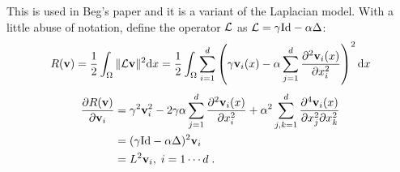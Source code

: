 \documentclass[letterpaper,12pt]{article}
\begin{document}
This is used in Beg's paper \cite{Beg2005Computing} and it is a
variant of the Laplacian model. With a little abuse of notation, define the operator $\mathcal{L}$ as $\mathcal{L} = \gamma \text{Id} - \alpha \Delta$:
\begin{align}
& R(\mathbf{v}) = \frac{1}{2} \int_\Omega \| \mathcal{L} \mathbf{v} \| ^2 \text{d} x
= \frac{1}{2} \int_\Omega \sum_{i=1}^d  
\left(
\gamma \mathbf{v}_i(x) - \alpha \sum_{j=1}^d  \frac{\partial^2 \mathbf{v}_i(x)}{\partial x_i^2}
\right)^2 \text{d} x
\\
\end{align}
\begin{equation}
\label{eq:dBeg}
\begin{split}
\frac{\partial R(\mathbf{v})}{\partial \mathbf{v}_i} 
& = 
\gamma^2 \mathbf{v}_i^2 - 2 \gamma \alpha \sum_{j=1}^d{\frac{\partial^2 \mathbf{v}_i(x)}{\partial x_i^2}} 
+ \alpha^2 \sum_{j,k=1}^d{\frac{\partial^4 \mathbf{v}_i(x)}{\partial x_j^2 \partial x_k^2}} 
\\
& = (\gamma \text{Id} - \alpha \Delta)^2 \mathbf{v}_i \\
& = L^2 \mathbf{v}_i
, \; i=1 \cdots d \;.
\end{split} 
\end{equation}
\end{document}
